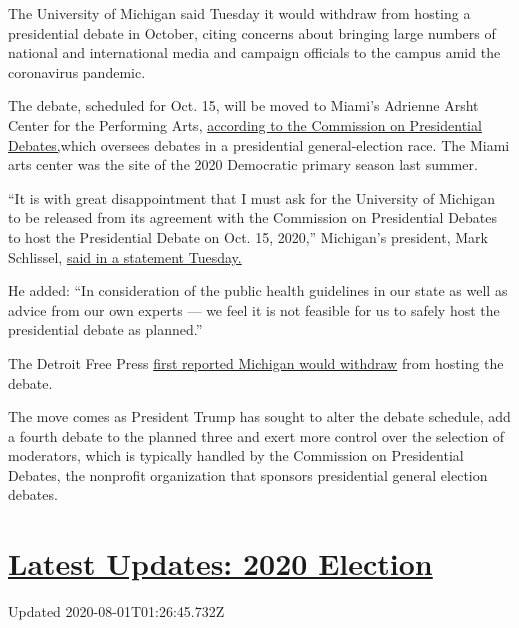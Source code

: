 The University of Michigan said Tuesday it would withdraw from hosting a
presidential debate in October, citing concerns about bringing large
numbers of national and international media and campaign officials to
the campus amid the coronavirus pandemic.

The debate, scheduled for Oct. 15, will be moved to Miami's Adrienne
Arsht Center for the Performing Arts,
\href{https://www.debates.org/2020/06/23/statement-second-presidential-debate/}{according
to the Commission on Presidential Debates,}which oversees debates in a
presidential general-election race. The Miami arts center was the site
of the 2020 Democratic primary season last summer.

``It is with great disappointment that I must ask for the University of
Michigan to be released from its agreement with the Commission on
Presidential Debates to host the Presidential Debate on Oct. 15, 2020,''
Michigan's president, Mark Schlissel,
\href{https://record.umich.edu/articles/u-m-no-longer-hosting-oct-15-presidential-debate/}{said
in a statement Tuesday.}

He added: ``In consideration of the public health guidelines in our
state as well as advice from our own experts --- we feel it is not
feasible for us to safely host the presidential debate as planned.''

The Detroit Free Press
\href{https://www.freep.com/story/news/education/2020/06/22/u-m-withdraw-hosting-october-presidential-debate/3239836001/}{first
reported Michigan would withdraw} from hosting the debate.

The move comes as President Trump has sought to alter the debate
schedule, add a fourth debate to the planned three and exert more
control over the selection of moderators, which is typically handled by
the Commission on Presidential Debates, the nonprofit organization that
sponsors presidential general election debates.

\hypertarget{latest-updates-2020-election}{%
\section{\texorpdfstring{\href{https://www.nytimes.com/2020/07/31/us/elections/biden-vs-trump.html?action=click\&pgtype=Article\&state=default\&region=MAIN_CONTENT_1\&context=storylines_live_updates}{Latest
Updates: 2020
Election}}{Latest Updates: 2020 Election}}\label{latest-updates-2020-election}}

Updated 2020-08-01T01:26:45.732Z

